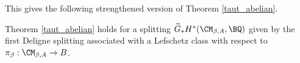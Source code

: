 This gives the following strengthened version of Theorem \ref{taut_abelian}.

\begin{thm}
\notready\label{strengthened2.1}
Theorem \ref{taut_abelian} holds for a splitting $\widetilde{G}_\ast H^\ast(\CM_{\beta,A}, \BQ)$ given by the first Deligne splitting associated with a Lefschetz class with respect to $\pi_\beta: \CM_{\beta,A} \to B$.
\end{thm}
